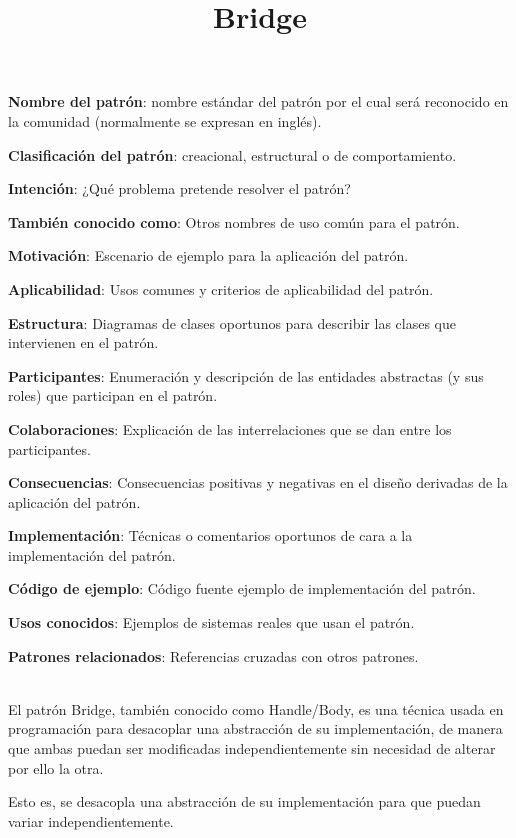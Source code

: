 \documentclass[a4paper,10pt]{report}
\begin{document}
    \item{\textbf{Nombre del patrón}: nombre estándar del patrón por el cual será reconocido en la comunidad (normalmente se expresan en inglés).}
    \item{\textbf{Clasificación del patrón}: creacional, estructural o de comportamiento.}
    \item{\textbf{Intención}: ¿Qué problema pretende resolver el patrón? }
    \item{\textbf{También conocido como}: Otros nombres de uso común para el patrón.}
    \item{\textbf{Motivación}: Escenario de ejemplo para la aplicación del patrón.}
    \item{\textbf{Aplicabilidad}: Usos comunes y criterios de aplicabilidad del patrón.}
    \item{\textbf{Estructura}: Diagramas de clases oportunos para describir las clases que intervienen en el patrón.}
    \item{\textbf{Participantes}: Enumeración y descripción de las entidades abstractas (y sus roles) que participan en el patrón.}
    \item{\textbf{Colaboraciones}: Explicación de las interrelaciones que se dan entre los participantes.}
    \item{\textbf{Consecuencias}: Consecuencias positivas y negativas en el diseño derivadas de la aplicación del patrón.}
    \item{\textbf{Implementación}: Técnicas o comentarios oportunos de cara a la implementación del patrón.}
    \item{\textbf{Código de ejemplo}: Código fuente ejemplo de implementación del patrón.}
    \item{\textbf{Usos conocidos}: Ejemplos de sistemas reales que usan el patrón.}
    \item{\textbf{Patrones relacionados}: Referencias cruzadas con otros patrones.\\\\}                                            
    
\title{\textbf{Bridge\\}}

El patrón Bridge, también conocido como Handle/Body, es una técnica usada en programación para desacoplar una abstracción de su implementación, de manera que ambas puedan ser modificadas independientemente sin necesidad de alterar por ello la otra.

Esto es, se desacopla una abstracción de su implementación para que puedan variar independientemente.\\
\end{document}
